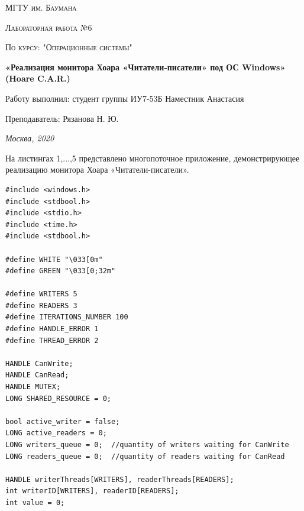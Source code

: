 \documentclass[12pt]{report}
\begin{document}
 
\begin{titlepage}
	\centering
	{\scshape\LARGE МГТУ им. Баумана \par}
	\vspace{3cm}
	{\scshape\Large Лабораторная работа №6\par}
	\vspace{0.5cm}	
	{\scshape\Large По курсу: "Операционные системы"\par}
	\vspace{1.5cm}
	{\huge\bfseries «Реализация монитора Хоара «Читатели-писатели» под ОС Windows» (Hoare C.A.R.)\par}
	\vspace{2cm}
	\Large Работу выполнил: студент группы ИУ7-53Б Наместник Анастасия\par
	\vspace{0.5cm}
	\Large Преподаватель:  Рязанова Н. Ю.\par

	\vfill
	\large \textit {Москва, 2020} \par
\end{titlepage}

\newpage

На листингах 1,...,5 представлено многопоточное приложение, демонстрирующее реализацию монитора Хоара «Читатели-писатели».

\begin{lstlisting}[label=some-code,caption=Начальные установки]
#include <windows.h>
#include <stdbool.h>
#include <stdio.h>
#include <time.h>
#include <stdbool.h>

#define WHITE "\033[0m"
#define GREEN "\033[0;32m"

#define WRITERS 5
#define READERS 3
#define ITERATIONS_NUMBER 100
#define HANDLE_ERROR 1
#define THREAD_ERROR 2

HANDLE CanWrite;
HANDLE CanRead;
HANDLE MUTEX;
LONG SHARED_RESOURCE = 0;

bool active_writer = false;
LONG active_readers = 0;
LONG writers_queue = 0;  //quantity of writers waiting for CanWrite
LONG readers_queue = 0;  //quantity of readers waiting for CanRead

HANDLE writerThreads[WRITERS], readerThreads[READERS];
int writerID[WRITERS], readerID[READERS];
int value = 0;
\end{lstlisting}
\end{document}
